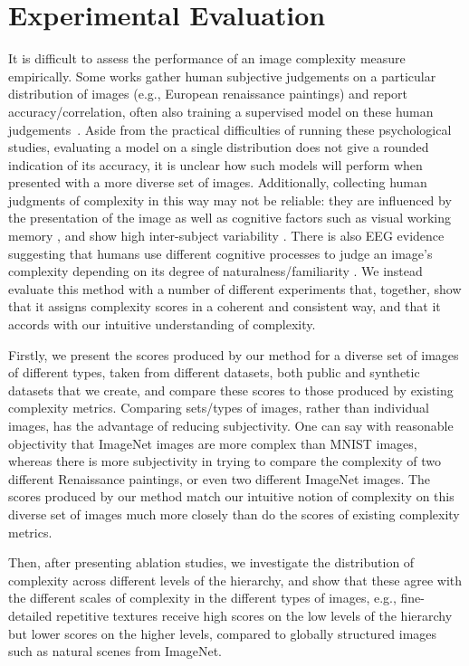 \documentclass[a4paper,fleqn]{cas-sc}
\theoremstyle{remark}
\begin{document}
\section{Experimental Evaluation} \label{sec:experimental-evaluation}
It is difficult to assess the performance of an image complexity measure empirically. Some works gather human subjective judgements on a particular distribution of images (e.g., European renaissance paintings) and report accuracy/correlation, often also training a supervised model on these human judgements~\citep{machado2015computerized,nagle2020predicting}. Aside from the practical difficulties of running these psychological studies, evaluating a model on a single distribution does not give a rounded indication of its accuracy, it is unclear how such models will perform when presented with a more diverse set of images. Additionally, collecting human judgments of complexity in this way may not be reliable: they are influenced by the presentation of the image as well as cognitive factors such as visual working memory \citep{sherman2013visual}, and show high inter-subject variability \citep{madrid2019human}. There is also EEG evidence suggesting that humans use different cognitive processes to judge an image's complexity depending on its degree of naturalness/familiarity \citep{nicolae2020preparatory}. We instead evaluate this method with a number of different experiments that, together, show that it assigns complexity scores in a coherent and consistent way, and that it accords with our intuitive understanding of complexity. 

Firstly, we present the scores produced by our method for a diverse set of images of different types, taken from different datasets, both public and synthetic datasets that we create, and compare these scores to those produced by existing complexity metrics. Comparing sets/types of images, rather than individual images, has the advantage of reducing subjectivity. One can say with reasonable objectivity that ImageNet images are more complex than MNIST images, whereas  there is more subjectivity in trying to compare the complexity of two different Renaissance paintings, or even two different ImageNet images. The scores produced by our method match our intuitive notion of complexity on this diverse set of images much more closely than do the scores of existing complexity metrics.

Then, after presenting ablation studies, we investigate the distribution of complexity across different levels of the hierarchy, and show that these agree with the different scales of complexity in the different types of images, e.g., fine-detailed repetitive textures receive high scores on the low levels of the hierarchy but lower scores on the higher levels, compared to globally structured images such as natural scenes from ImageNet.
\end{document}
